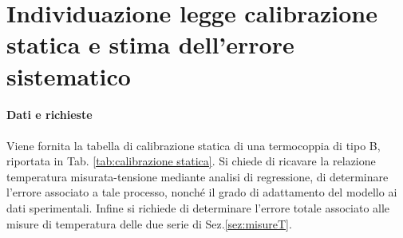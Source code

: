 \section{Individuazione legge calibrazione statica e stima dell'errore sistematico} \label{sec:legge}

\paragraph{Dati e richieste}
Viene fornita la tabella di calibrazione statica di una termocoppia di tipo B, riportata in Tab. \ref{tab:calibrazione statica}. Si chiede di ricavare la relazione temperatura misurata-tensione mediante analisi di regressione, di determinare l'errore associato a tale processo, nonché il grado di adattamento del modello ai dati sperimentali. Infine si richiede di determinare l'errore totale associato alle misure di temperatura delle due serie di Sez.\ref{sez:misureT}.

